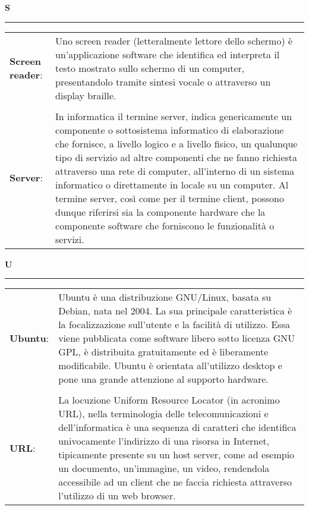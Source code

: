 	\hfill\Huge{\textbf{S}}\\
\rule{16cm}{.6pt}
\normalsize
	\begin{longtable}{p{} p{}} 
	    \\
		    \textbf{Screen reader}: & Uno screen reader (letteralmente lettore dello schermo) è un'applicazione software che identifica ed interpreta il testo mostrato sullo schermo di un computer, presentandolo tramite sintesi vocale o attraverso un display braille.\\
		    \\
		    \textbf{Server}: & In informatica il termine server, indica genericamente un componente o sottosistema informatico di elaborazione che fornisce, a livello logico e a livello fisico, un qualunque tipo di servizio ad altre componenti che ne fanno richiesta attraverso una rete di computer, all'interno di un sistema informatico o direttamente in locale su un computer. Al termine server, così come per il termine client, possono dunque riferirsi sia la componente hardware che la componente software che forniscono le funzionalità o servizi.\\
	\end{longtable}
	
\hfill\Huge{\textbf{U}}\\
\rule{16cm}{.6pt}
\normalsize
	\begin{longtable}{p{} p{}}
	\textbf{Ubuntu}: & Ubuntu è una distribuzione GNU/Linux, basata su Debian, nata nel 2004. La sua principale caratteristica è la focalizzazione sull'utente e la facilità di utilizzo. Essa viene pubblicata come software libero sotto licenza GNU GPL, è distribuita gratuitamente ed è liberamente modificabile. Ubuntu è orientata all'utilizzo desktop e pone una grande attenzione al supporto hardware.\\
	    \\
		    \textbf{URL}: & La locuzione Uniform Resource Locator (in acronimo URL), nella terminologia delle telecomunicazioni e dell'informatica è una sequenza di caratteri che identifica univocamente l'indirizzo di una risorsa in Internet, tipicamente presente su un host server, come ad esempio un documento, un'immagine, un video, rendendola accessibile ad un client che ne faccia richiesta attraverso l'utilizzo di un web browser.\\
	\end{longtable}

	
	
	
	
	
	
	
	
	
	
	
	
	
	

